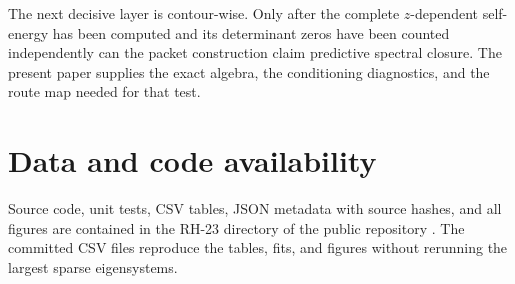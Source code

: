 \documentclass[11pt]{article}
\theoremstyle{definition}
\theoremstyle{remark}
\begin{document}
The next decisive layer is contour-wise.  Only after the complete
$z$-dependent self-energy has been computed and its determinant zeros have
been counted independently can the packet construction claim predictive
spectral closure.  The present paper supplies the exact algebra, the
conditioning diagnostics, and the route map needed for that test.

\section*{Data and code availability}

Source code, unit tests, CSV tables, JSON metadata with source hashes, and
all figures are contained in the RH-23 directory of the public repository
\citep{WangPhysicalFeshbachCode2026}.  The committed CSV files reproduce
the tables, fits, and figures without rerunning the largest sparse
eigensystems.



\end{document}
